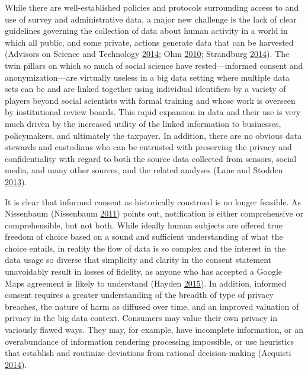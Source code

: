 \documentclass[]{krantz}
\begin{document}
While there are well-established policies and protocols surrounding
access to and use of survey and administrative data, a major new
challenge is the lack of clear guidelines governing the collection of
data about human activity in a world in which all public, and some
private, actions generate data that can be harvested (Advisors on
Science and Technology \protect\hyperlink{ref-house2014big}{2014}; Ohm
\protect\hyperlink{ref-ohm2010broken}{2010}; Strandburg
\protect\hyperlink{ref-Strandburg2014}{2014}). The twin pillars on which
so much of social science have rested---informed consent and
anonymization---are virtually useless in a big data setting where
multiple data sets can be and are linked together using individual
identifiers by a variety of players beyond social scientists with formal
training and whose work is overseen by institutional review boards. This
rapid expansion in data and their use is very much driven by the
increased utility of the linked information to businesses, policymakers,
and ultimately the taxpayer. In addition, there are no obvious data
stewards and custodians who can be entrusted with preserving the privacy
and confidentiality with regard to both the source data collected from
sensors, social media, and many other sources, and the related analyses
(Lane and Stodden \protect\hyperlink{ref-lane2013me}{2013}).

It is clear that informed consent as historically construed is no longer
feasible. As Nissenbaum (Nissenbaum
\protect\hyperlink{ref-nissenbaum2011contextual}{2011}) points out,
notification is either comprehensive or comprehensible, but not both.
While ideally human subjects are offered true freedom of choice based on
a sound and sufficient understanding of what the choice entails, in
reality the flow of data is so complex and the interest in the data
usage so diverse that simplicity and clarity in the consent statement
unavoidably result in losses of fidelity, as anyone who has accepted a
Google Maps agreement is likely to understand (Hayden
\protect\hyperlink{ref-check2015researchers}{2015}). In addition,
informed consent requires a greater understanding of the breadth of type
of privacy breaches, the nature of harm as diffused over time, and an
improved valuation of privacy in the big data context. Consumers may
value their own privacy in variously flawed ways. They may, for example,
have incomplete information, or an overabundance of information
rendering processing impossible, or use heuristics that establish and
routinize deviations from rational decision-making (Acquisti
\protect\hyperlink{ref-Acquisti2014}{2014}).
\end{document}
